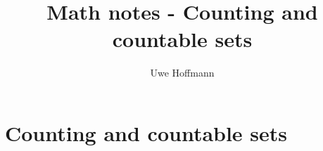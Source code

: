 

\title{Math notes - Counting and countable sets}
\author{Uwe Hoffmann}



\setcounter{chapter}{1}
\chapter*{Counting and countable sets}
